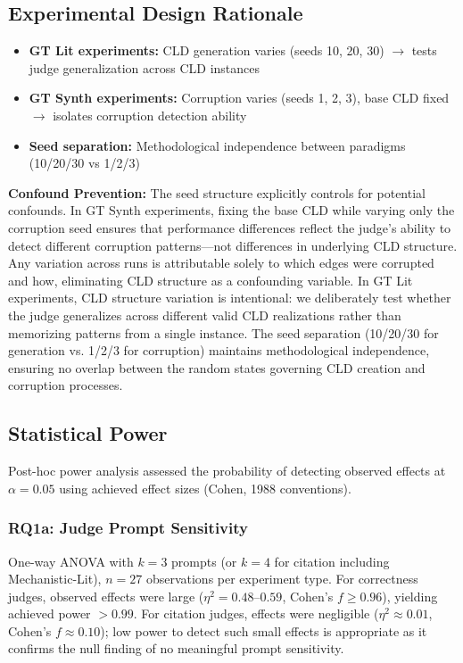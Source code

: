 \subsection{Experimental Design Rationale}
\begin{itemize}[noitemsep]
    \item \textbf{GT Lit experiments:} CLD generation varies (seeds 10, 20, 30) $\rightarrow$ tests judge generalization across CLD instances
    \item \textbf{GT Synth experiments:} Corruption varies (seeds 1, 2, 3), base CLD fixed $\rightarrow$ isolates corruption detection ability
    \item \textbf{Seed separation:} Methodological independence between paradigms (10/20/30 vs 1/2/3)
\end{itemize}

\textbf{Confound Prevention:} The seed structure explicitly controls for potential confounds. In GT Synth experiments, fixing the base CLD while varying only the corruption seed ensures that performance differences reflect the judge's ability to detect different corruption patterns---not differences in underlying CLD structure. Any variation across runs is attributable solely to which edges were corrupted and how, eliminating CLD structure as a confounding variable. In GT Lit experiments, CLD structure variation is intentional: we deliberately test whether the judge generalizes across different valid CLD realizations rather than memorizing patterns from a single instance. The seed separation (10/20/30 for generation vs. 1/2/3 for corruption) maintains methodological independence, ensuring no overlap between the random states governing CLD creation and corruption processes.

\subsection{Statistical Power}

Post-hoc power analysis assessed the probability of detecting observed effects at $\alpha = 0.05$ using achieved effect sizes (Cohen, 1988 conventions).

\subsubsection{RQ1a: Judge Prompt Sensitivity}
One-way ANOVA with $k=3$ prompts (or $k=4$ for citation including Mechanistic-Lit), $n=27$ observations per experiment type. For correctness judges, observed effects were large ($\eta^2 = 0.48$--$0.59$, Cohen's $f \geq 0.96$), yielding achieved power $>0.99$. For citation judges, effects were negligible ($\eta^2 \approx 0.01$, Cohen's $f \approx 0.10$); low power to detect such small effects is appropriate as it confirms the null finding of no meaningful prompt sensitivity.

